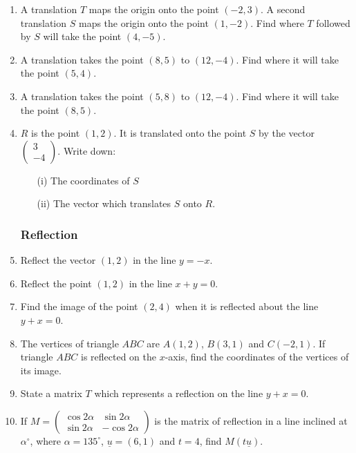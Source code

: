 \begin{enumerate}
	\item A translation $T$ maps the origin onto the point $(-2,3)$. A second translation $S$ maps the origin onto the point $(1,-2)$. Find where $T$ followed by $S$ will take the point $(4,-5)$.
	
	\item A translation takes the point $(8,5)$ to $(12,-4)$. Find where it will take the point $(5,4)$.
	
	\item A translation takes the point $(5,8)$ to $(12,-4)$. Find where it will take the point $(8,5)$.
	
	\item $R$ is the point $(1,2)$. It is translated onto the point $S$ by the vector $
	\begin{pmatrix}
	3 \\
	-4
	\end{pmatrix}$. Write down:
		\begin{itemize}
		\item[(i)] The coordinates of $S$
		\item[(ii)] The vector which translates $S$ onto $R$.
		\end{itemize}
		
		
		
			\subsubsection{Reflection}
			
	\item Reflect the vector $(1,2)$ in the line $y = -x$.
	
	\item Reflect the point $(1,2)$ in the line $x + y = 0$.
	
	\item Find the image of the point $(2,4)$ when it is reflected about the line $y + x = 0$.
	
	\item The vertices of triangle $ABC$ are $A(1,2)$, $B(3,1)$ and $C(-2,1)$. If triangle $ABC$ is reflected on the $x$-axis, find the coordinates of the vertices of its image.
		
	\item State a matrix $T$ which represents a reflection on the line $y + x = 0$.
	
	\item If $M =
	\begin{pmatrix}
	\cos 2\alpha & \sin 2\alpha \\
	\sin 2\alpha & -\cos 2\alpha
	\end{pmatrix}$ is the matrix of reflection in a line inclined at $\alpha^\circ$, where $\alpha = 135^\circ$, $\underline{u} = (6,1)$ and $t = 4$, find $M(t\underline{u})$.
	

\end{enumerate}

